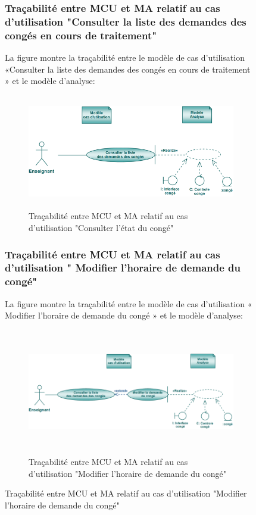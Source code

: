 \documentclass[12 pt]{report}
\begin{document}
\begin{figure}[h]
\begin{center}
\subsubsection{Traçabilité entre MCU et MA relatif au cas d’utilisation "Consulter la liste des demandes des congés en cours de traitement" }
La figure  montre la traçabilité entre le modèle de cas d’utilisation «Consulter la liste des demandes des congés en cours de traitement » et le modèle d’analyse:

\begin{figure}[h]
\begin{center}
\includegraphics[width= 14cm , height =5cm]{tcc.PNG}
\caption{Traçabilité entre MCU et MA relatif au cas d’utilisation "Consulter l'état du congé"}
\end{center}
\end{figure}
\subsubsection{Traçabilité entre MCU et MA relatif au cas d’utilisation " Modifier l'horaire de demande du congé" }
La figure  montre la traçabilité entre le modèle de cas d’utilisation « Modifier l'horaire de demande du congé » et le modèle d’analyse:

\begin{figure}[h]
\begin{center}
\includegraphics[width= 14cm , height =5.5cm]{tmc.PNG}
\caption{Traçabilité entre MCU et MA relatif au cas d’utilisation "Modifier l'horaire de demande du congé"}
\end{center}
\end{figure}

\end{center}
\end{figure}
\end{document}
